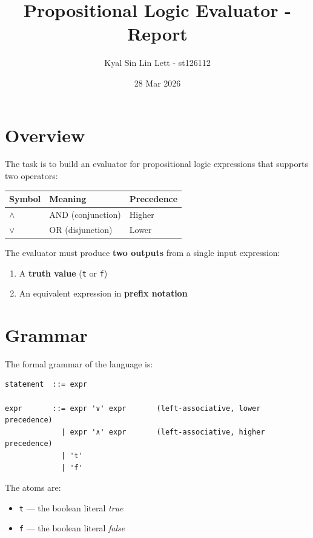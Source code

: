 \documentclass[12pt,a4paper]{article}
\title{Propositional Logic Evaluator - Report}
\author{Kyal Sin Lin Lett - st126112}
\date{28 Mar 2026}
\begin{document}
\maketitle

\newpage

\section{Overview}

The task is to build an evaluator for propositional logic expressions that
supports two operators:

\begin{center}
\begin{tabular}{lll}
\toprule
Symbol & Meaning & Precedence \\
\midrule
\texttt{$\land$} & AND (conjunction) & Higher \\
\texttt{$\lor$} & OR (disjunction) & Lower \\
\bottomrule
\end{tabular}
\end{center}

The evaluator must produce \textbf{two outputs} from a single input expression:

\begin{enumerate}
    \item A \textbf{truth value} (\texttt{t} or \texttt{f})
    \item An equivalent expression in \textbf{prefix notation}
\end{enumerate}

\section{Grammar}

The formal grammar of the language is:

\begin{lstlisting}
statement  ::= expr

expr       ::= expr '∨' expr       (left-associative, lower precedence)
             | expr '∧' expr       (left-associative, higher precedence)
             | 't'
             | 'f'
\end{lstlisting}

The atoms are:

\begin{itemize}
    \item \texttt{t} --- the boolean literal \emph{true}
    \item \texttt{f} --- the boolean literal \emph{false}
\end{itemize}
\end{document}
